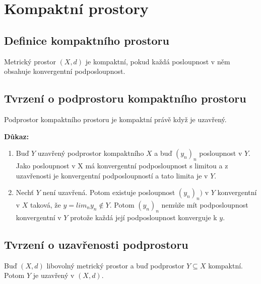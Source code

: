 \documentclass[../main.tex]{subfiles}
\begin{document}
\section{Kompaktní prostory}
\subsection{Definice kompaktního prostoru}
\hspace{1.2mm}
\noindent
Metrický prostor $(X,d)$ je kompaktní, pokud každá posloupnost v něm obsahuje konvergentní podposloupnost.

\subsection{Tvrzení o podprostoru kompaktního prostoru}
\hspace{1.2mm}
\noindent
Podprostor kompaktního prostoru je kompaktní právě když je uzavřený.

\vspace{5mm}
\noindent
\textbf{Důkaz:} 
\begin{enumerate}
    \item Buď $Y$ uzavřený podprostor kompaktního $X$ a buď $(y_n)_n$ posloupnost v $Y$. Jako posloupnost v X má 
    konvergentní podposloupnost s limitou a z uzavřenosti je konvergentní podposloupností a tato limita je v $Y$.
    \item Nechť $Y$ není uzavřená. Potom existuje posloupnost $(y_n)_n)$ v $Y$ konvergentní v $X$ taková, že $y = lim_n y_n \notin Y$. Potom $(y_n)_n$
    nemůže mít podposloupnost konvergentní v $Y$ protože každá její podposloupnost konverguje k $y$.
\end{enumerate}

\subsection{Tvrzení o uzavřenosti podprostoru}
\hspace{1.2mm}
\noindent
Buď $(X,d)$ libovolný metrický prostor a
buď podprostor $Y \subseteq X$ kompaktní. Potom $Y$ je uzavřený v $(X,d)$.
\end{document}
